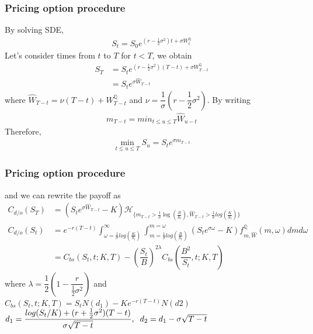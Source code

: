 \documentclass{beamer}
\begin{document}
\begin{frame}
\frametitle{Pricing option procedure}
By solving SDE, 
\begin{align*}
S_t=S_0e^{\left(r -\frac{1}{2}\sigma^2 \right)t+\sigma W_t^{\mathbb{Q}}} \end{align*} 
Let's consider times from $t$ to $T$ for $t<T$, we obtain
\begin{align*}
	S_T&=S_te^{\left(r -\frac{1}{2}\sigma^2 \right)(T-t)+\sigma W_{T-t}^\mathbb{Q}}\\
	&=S_te^{\sigma \widehat{W}_{T-t}}
\end{align*}
where $\widehat{W}_{T-t}=\nu (T-t)+W_{T-t}^\mathbb{Q}$ and $\nu=\dfrac{1}{\sigma}(r-\dfrac{1}{2}\sigma^2)$. By writing
\begin{align*}
m_{T-t}=min_{t\leq u \leq T}\widehat{W}_{u-t}
\end{align*}
Therefore, 
\begin{align*}
\displaystyle \min_{t\leq u \leq T}S_u=S_te^{\sigma 	m_{T-t}}
\end{align*} 
\end{frame}
\begin{frame}
\frametitle{Pricing option procedure}
and we can rewrite the payoff as 
\begin{align*}
C_{d/o}(S_T)&=(S_te^{\sigma \widehat{W}_{T-t}}-K)\mathcal{H}_{\{m_{T-t}>\frac{1}{\sigma}\log\left(\frac{B}{S_t}\right), \widehat{W}_{T-t}>\frac{1}{\sigma}log\left(\frac{K}{S_t}\right) \}} \\
C_{d/o}(S_t)&=e^{-r(T-t)}\displaystyle \int_{\omega =\frac{1}{\sigma}log\left(\frac{K}{S_t}\right) }^{\infty}\displaystyle \int_{m =\frac{1}{\sigma}log\left(\frac{B}{S_t}\right) }^{m=\omega}(S_te^{\sigma \omega}-K)f^\mathbb{Q}_{m,\widehat{W}}(m, \omega)dmd\omega\\
&=C_{bs}(S_t,t;K,T)-\left(\dfrac{S_t}{B}\right)^{2\lambda}C_{bs}(\dfrac{B^2}{S_t},t;K,T)
\end{align*}
where $\lambda = \dfrac{1}{2}\left(1-\dfrac{r}{\frac{1}{2}\sigma^2}\right)$ and \\[0.2cm]
$C_{bs}(S_t,t;K,T)=S_tN(d_1)-Ke^{-r(T-t)}N(d2)$\\[0.2cm]
$d_1=\dfrac{log(S_t/K)+(r+\frac{1}{2}\sigma^2)(T-t)}{\sigma\sqrt{T-t}}, \hspace{0.2cm}d_2=d_1-\sigma\sqrt{T-t}$
\end{frame}
\end{document}
